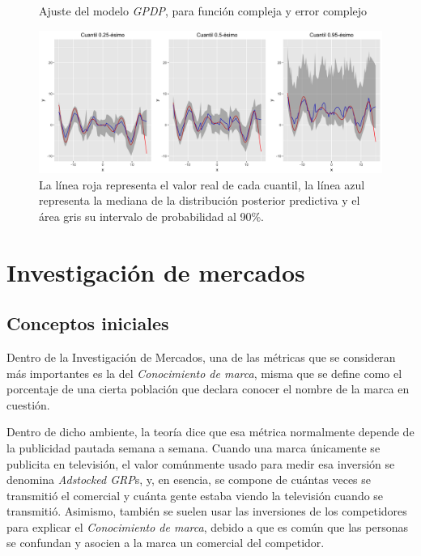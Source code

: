 \begin{figure}[H]
	\centering
	\caption{Ajuste del modelo \textit{GPDP}, para funci\'on compleja y error complejo}
	\includegraphics[width=\textwidth]{Figures/Simulation/complex_g_complex_error/fitted_models.png}
	\captionsetup{singlelinecheck=off,font=footnotesize}
    \caption*{La l\'inea roja representa el valor real de cada cuantil, la l\'inea azul representa la mediana de la distribuci\'on posterior predictiva y el \'area gris su intervalo de probabilidad al 90\%.}
	\label{fitted_cgce}
\end{figure}

\section{Investigaci\'on de mercados}

\subsection{Conceptos iniciales}

Dentro de la Investigaci\'on de Mercados, una de las m\'etricas que se consideran m\'as importantes es la del \textit{Conocimiento de marca}, misma que se define como el porcentaje de una cierta poblaci\'on que declara conocer el nombre de la marca en cuesti\'on.

Dentro de dicho ambiente, la teor\'ia dice que esa m\'etrica normalmente depende de la publicidad pautada semana a semana. Cuando una marca \'unicamente se publicita en televisi\'on, el valor com\'unmente usado para medir esa inversi\'on se denomina \textit{Adstocked GRP}s, y, en esencia, se compone de cu\'antas veces se transmiti\'o el comercial y cu\'anta gente estaba viendo la televisi\'on cuando se transmiti\'o. Asimismo, tambi\'en se suelen usar las inversiones de los competidores para explicar el \textit{Conocimiento de marca}, debido a que es com\'un que las personas se confundan y asocien a la marca un comercial del competidor.

